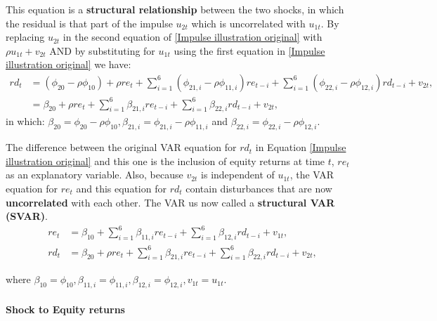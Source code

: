 \documentclass[11pt]{article}
\begin{document}
This equation is a \textbf{structural relationship} between the two shocks, in which the residual is that part of the impulse $u_{2t}$ which is uncorrelated with $u_{1t}$. By replacing $u_{2t}$ in the second equation of \eqref{Impulse illustration original} with $\rho u_{1t} + v_{2t}$ AND by substituting for $u_{1t}$ using the first equation in \eqref{Impulse illustration original} we have:
\begin{equation}
\begin{aligned}
r d_t & =\left(\phi_{20}-\rho \phi_{10}\right)+\rho r e_t+\sum_{i=1}^6\left(\phi_{21, i}-\rho \phi_{11, i}\right) r e_{t-i}+\sum_{i=1}^6\left(\phi_{22, i}-\rho \phi_{12, i}\right) r d_{t-i}+v_{2 t}, \\
& =\beta_{20}+\rho r e_t+\sum_{i=1}^6 \beta_{21, i} r e_{t-i}+\sum_{i=1}^6 \beta_{22, i} r d_{t-i}+v_{2 t},
\end{aligned}
\end{equation}
in which: $\beta_{20}=\phi_{20}-\rho \phi_{10}, \beta_{21, i}=\phi_{21, i}-\rho \phi_{11, i}$ and $\beta_{22, i}=\phi_{22, i}-\rho \phi_{12, i}$.

The difference between the original VAR equation for $rd_t$ in Equation \eqref{Impulse illustration original} and this one is the inclusion of equity returns at time $t$, $re_t$ as an explanatory variable. Also, because $v_{2t}$ is independent of $u_{1t}$, the VAR equation for $re_t$ and this equation for $rd_t$ contain disturbances that are now \textbf{uncorrelated} with each other. The VAR us now called a \textbf{structural VAR (SVAR)}.
\begin{equation}
\label{SVAR re rd}
\begin{aligned}
r e_t & =\beta_{10}+\sum_{i=1}^6 \beta_{11, i} r e_{t-i}+\sum_{i=1}^6 \beta_{12, i} r d_{t-i}+v_{1 t}, \\ 
r d_t & =\beta_{20}+\rho r e_t+\sum_{i=1}^6 \beta_{21, i} r e_{t-i}+\sum_{i=1}^6 \beta_{22, i} r d_{t-i}+v_{2 t},
\end{aligned}
\end{equation}

where $\beta_{10} = \phi_{10}, \beta_{11,i} = \phi_{11,i}, \beta_{12,i} = \phi_{12,i}, v_{1t} = u_{1t}$.

\newpage

\paragraph{Shock to Equity returns} \mbox{}
\end{document}
